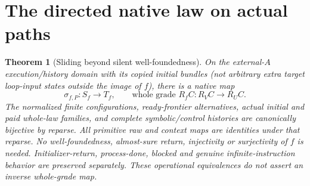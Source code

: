\documentclass[11pt]{article}
\newtheorem{theorem}{Theorem}\newtheorem{proposition}{Proposition}
\begin{document}
\section{The directed native law on actual paths}
\begin{theorem}[Sliding beyond silent well-foundedness]
On the external-$A$ execution/history domain with its copied initial bundles (not arbitrary extra target loop-input states outside the image of $f$), there is a native map
\[
 \sigma_{f,P}:S_f\longrightarrow T_f,
 \qquad \text{whole grade }R_fC:R_VC\longrightarrow R_UC. \tag{2}
\]
The normalized finite configurations, ready-frontier alternatives, actual initial and paid whole-law families, and complete symbolic/control histories are canonically bijective by reparse. All primitive raw and context maps are identities under that reparse. No well-foundedness, almost-sure return, injectivity or surjectivity of $f$ is needed. Initializer-return, process-done, blocked and genuine infinite-instruction behavior are preserved separately. These operational equivalences do not assert an inverse whole-grade map.
\end{theorem}
\end{document}
